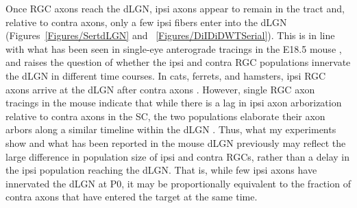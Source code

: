 Once RGC axons reach the dLGN, ipsi axons appear to remain in the tract and, relative to contra axons, only a few ipsi fibers enter into the dLGN (Figures~\ref{Figures/SertdLGN} and ~\ref{Figures/DiIDiDWTSerial}).
This is in line with what has been seen in single-eye anterograde tracings in the E18.5 mouse \cite{godement1984prenatal}, and raises the question of whether the ipsi and contra RGC populations innervate the dLGN in different time courses.
In cats, ferrets, and hamsters, ipsi RGC axons arrive at the dLGN after contra axons \cite{frost1979postnatal,linden1981dorsal,shatz1983prenatal}.
However, single RGC axon tracings in the mouse indicate that while there is a lag in ipsi axon arborization relative to contra axons in the SC, the two populations elaborate their axon arbors along a similar timeline within the dLGN \cite{dhande2011development}.
Thus, what my experiments show and what has been reported in the mouse dLGN previously \cite{godement1984prenatal} may reflect the large difference in population size of ipsi and contra RGCs, rather than a delay in the ipsi population reaching the dLGN.
That is, while few ipsi axons have innervated the dLGN at P0, it may be proportionally equivalent to the fraction of contra axons that have entered the target at the same time.